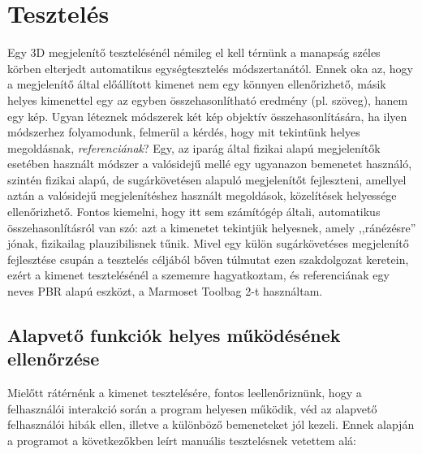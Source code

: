 \section{Tesztelés}

Egy 3D megjelenítő tesztelésénél némileg el kell térnünk a manapság széles körben elterjedt automatikus egységtesztelés módszertanától. Ennek oka az, hogy a megjelenítő által előállított kimenet nem egy könnyen ellenőrizhető, másik helyes kimenettel egy az egyben összehasonlítható eredmény (pl. szöveg), hanem egy kép. Ugyan léteznek módszerek két kép objektív összehasonlítására, ha ilyen módszerhez folyamodunk, felmerül a kérdés, hogy mit tekintünk helyes megoldásnak, \textit{referenciának}? Egy, az iparág által fizikai alapú megjelenítők esetében használt módszer a valósidejű mellé egy ugyanazon bemenetet használó, szintén fizikai alapú, de sugárkövetésen alapuló megjelenítőt fejleszteni, amellyel aztán a valósidejű megjelenítéshez használt megoldások, közelítések helyessége ellenőrizhető. Fontos kiemelni, hogy itt sem számítógép általi, automatikus összehasonlításról van szó: azt a kimenetet tekintjük helyesnek, amely ,,ránézésre'' jónak, fizikailag plauzibilisnek tűnik. Mivel egy külön sugárkövetéses megjelenítő fejlesztése csupán a tesztelés céljából bőven túlmutat ezen szakdolgozat keretein, ezért a kimenet tesztelésénél a szememre hagyatkoztam, és referenciának egy neves PBR alapú eszközt, a Marmoset Toolbag 2-t használtam.

\subsection{Alapvető funkciók helyes működésének ellenőrzése}

Mielőtt rátérnénk a kimenet tesztelésére, fontos leellenőriznünk, hogy a felhasználói interakció során a program helyesen működik, véd az alapvető felhasználói hibák ellen, illetve a különböző bemeneteket jól kezeli. Ennek alapján a programot a következőkben leírt manuális tesztelésnek vetettem alá:

\vspace{10pt}

